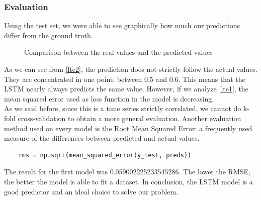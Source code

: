 \subsubsection{Evaluation}
Using the test set, we were able to see graphically how much our predictions differ from the ground truth. 
\begin{figure}[H]
    \centering
    
    \caption{Comparison between the real values and the predicted values}
    \label{lte2}
\end{figure}
As we can see from \autoref{lte2}, the prediction does not strictly follow the actual values. They are concentrated in one point, between 0.5 and 0.6. This means that the LSTM nearly always predicts the same value. However, if we analyze \autoref{lte1}, the mean squared error used as loss function in the model is decreasing. \\
As we said before, since this is a time series strictly correlated, we cannot do k-fold cross-validation to obtain a more general evaluation. Another evaluation method used on every model is the Root Mean Squared Error: a frequently used measure of the differences between predicted and actual values.
\begin{verbatim}
    rms = np.sqrt(mean_squared_error(y_test, preds))
\end{verbatim}
The result for the first model was 0.059002225233545286. The lower the RMSE, the better the model is able to fit a dataset. In conclusion, the LSTM model is a good predictor and an ideal choice to solve our problem.

